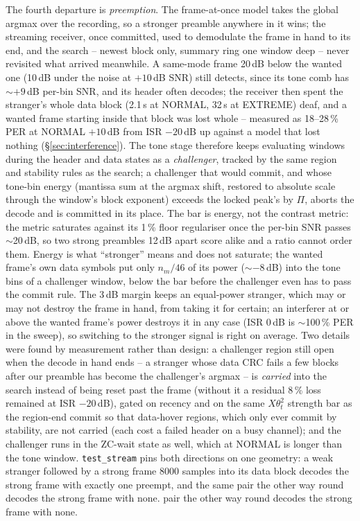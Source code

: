 \label{sec:tone_stream_preempt}
The fourth departure is \emph{preemption}.  The frame-at-once model
takes the global argmax over the recording, so a stronger preamble
anywhere in it wins; the streaming receiver, once committed, used to
demodulate the frame in hand to its end, and the search -- newest
block only, summary ring one window deep -- never revisited what
arrived meanwhile.  A same-mode frame 20\,dB below the wanted one
(10\,dB under the noise at $+10$\,dB SNR) still detects, since its
tone comb has $\sim$$+9$\,dB per-bin SNR, and its header often
decodes; the receiver then spent the stranger's whole data block
(2.1\,s at NORMAL, 32\,s at EXTREME) deaf, and a wanted frame starting
inside that block was lost whole -- measured as 18--28\,\% PER at
NORMAL $+10$\,dB from ISR $-20$\,dB up against a model that lost
nothing (\S\ref{sec:interference}).  The tone stage therefore keeps
evaluating windows during the header and data states as a
\emph{challenger}, tracked by the same region and stability rules as
the search; a challenger that would commit, and whose tone-bin energy
(mantissa sum at the argmax shift, restored to absolute scale through
the window's block exponent) exceeds the locked peak's by $\Pi$,
aborts the decode and is committed in its place.  The bar is energy,
not the contrast metric: the metric saturates against its 1\,\% floor
regulariser once the per-bin SNR passes $\sim$20\,dB, so two strong
preambles 12\,dB apart score alike and a ratio cannot order them.
Energy is what ``stronger'' means and does not saturate; the wanted
frame's own data symbols put only $n_m / 46$ of its power ($\sim$$-8$\,dB)
into the tone bins of a challenger window, below the bar before the
challenger even has to pass the commit rule.  The 3\,dB margin keeps an
equal-power stranger, which may or may not destroy the frame in hand,
from taking it for certain; an interferer at or above the wanted
frame's power destroys it in any case (ISR 0\,dB is $\sim$100\,\% PER
in the sweep), so switching to the stronger signal is right on
average.  Two details were found by measurement rather than design:
a challenger region still open when the decode in hand ends -- a
stranger whose data CRC fails a few blocks after our preamble has
become the challenger's argmax -- is \emph{carried} into the search
instead of being reset past the frame (without it a residual 8\,\%
loss remained at ISR $-20$\,dB), gated on recency and on the same
$X\theta_t^2$ strength bar as the region-end commit so that data-hover
regions, which only ever commit by stability, are not carried (each
cost a failed header on a busy channel); and the challenger runs in
the ZC-wait state as well, which at NORMAL is longer than the tone
window.  \texttt{test\_stream} pins both directions on one geometry:
a weak stranger followed by a strong frame 8000 samples into its data
block decodes the strong frame with exactly one preempt, and the same
pair the other way round decodes the strong frame with none.
pair the other way round decodes the strong frame with none.

